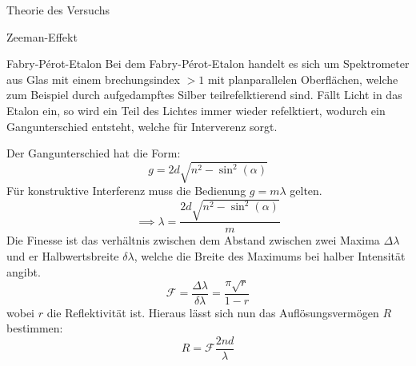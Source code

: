 \documentclass[pdftex, a4paper,11pt, twoside, ngerman]{report}
\begin{document}
\begin{chapter}{Theorie des Versuchs}
\begin{section}{Zeeman-Effekt}
      
      
      \begin{subsection}{Fabry-Pérot-Etalon}
        Bei dem Fabry-Pérot-Etalon handelt es sich um Spektrometer aus Glas mit
        einem brechungsindex $>1$ mit planparallelen Oberflächen, welche zum
        Beispiel durch aufgedampftes Silber teilrefelktierend sind. Fällt Licht
        in das Etalon ein, so wird ein Teil des Lichtes immer wieder
        refelktiert, wodurch ein Gangunterschied entsteht, welche für
        Interverenz sorgt. 
        
        Der Gangunterschied hat die Form:
        \begin{equation}
          \label{eq:Gangunterschied}
          g = 2d\sqrt{n^2-\sin^2(\alpha)}
        \end{equation}
        Für konstruktive Interferenz muss die Bedienung $g = m\lambda$ gelten.
        \begin{equation}
          \label{eq:GangunterschiedLambda}
          \implies \lambda = \frac{2d\sqrt{n^2-\sin^2(\alpha)}}m
        \end{equation}
        Die Finesse ist das verhältnis zwischen dem Abstand zwischen zwei
        Maxima $\Delta\lambda$ und er Halbwertsbreite $\delta\lambda$, welche
        die Breite des Maximums bei halber Intensität angibt.
        \begin{equation}
          \label{eq:Finesse}
          \mathcal{F}=\frac{\Delta\lambda}{\delta\lambda} =
          \frac{\pi\sqrt r}{1-r}
        \end{equation}
        wobei $r$ die Reflektivität ist.
        Hieraus lässt sich nun das Auflösungsvermögen $R$ bestimmen:
        \begin{equation}
          \label{eq:Aufloesung}
          R = \mathcal{F}\frac{2nd}{\lambda}
        \end{equation}
        \begin{figure}[b!]
          \centering
          \begin{minipage}{0.48\textwidth}
            \centering

\end{minipage}
\end{figure}
\end{subsection}
\end{section}
\end{chapter}
\end{document}
